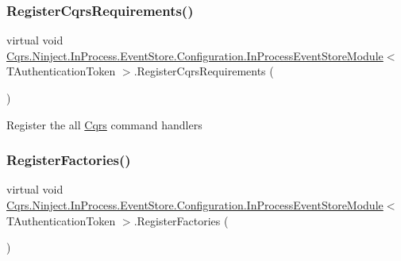 \subsubsection{\texorpdfstring{Register\+Cqrs\+Requirements()}{RegisterCqrsRequirements()}}
{\footnotesize\ttfamily virtual void \hyperlink{classCqrs_1_1Ninject_1_1InProcess_1_1EventStore_1_1Configuration_1_1InProcessEventStoreModule}{Cqrs.\+Ninject.\+In\+Process.\+Event\+Store.\+Configuration.\+In\+Process\+Event\+Store\+Module}$<$ T\+Authentication\+Token $>$.Register\+Cqrs\+Requirements (\begin{DoxyParamCaption}{ }\end{DoxyParamCaption})\hspace{0.3cm}{\ttfamily [virtual]}}



Register the all \hyperlink{namespaceCqrs}{Cqrs} command handlers 

\mbox{\label{classCqrs_1_1Ninject_1_1InProcess_1_1EventStore_1_1Configuration_1_1InProcessEventStoreModule_a4236d1ad83f4412e54491da63ca122d6}} 
\subsubsection{\texorpdfstring{Register\+Factories()}{RegisterFactories()}}
{\footnotesize\ttfamily virtual void \hyperlink{classCqrs_1_1Ninject_1_1InProcess_1_1EventStore_1_1Configuration_1_1InProcessEventStoreModule}{Cqrs.\+Ninject.\+In\+Process.\+Event\+Store.\+Configuration.\+In\+Process\+Event\+Store\+Module}$<$ T\+Authentication\+Token $>$.Register\+Factories (\begin{DoxyParamCaption}{ }\end{DoxyParamCaption})\hspace{0.3cm}{\ttfamily [virtual]}}



